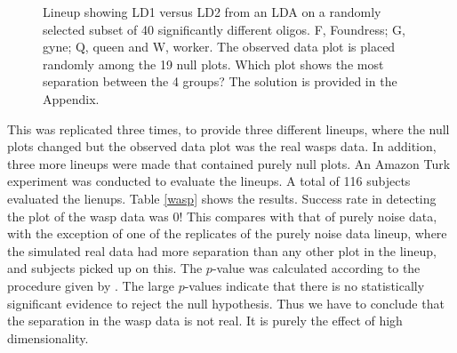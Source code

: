 \begin{figure}[hbtp]
   \centering
       \caption{Lineup showing LD1 versus LD2 from an LDA on a randomly selected subset of 40 significantly different oligos. F, Foundress; G, gyne; Q, queen and W, worker. The observed data plot is placed randomly among the 19 null plots. Which plot shows the most separation between the 4 groups? The solution is provided in the Appendix.}
       \label{toth_lineup}
\end{figure} 

This was replicated three times, to provide three different lineups, where the null plots changed but the observed data plot was the real wasps data. In addition, three more lineups were made that contained purely null plots. An Amazon Turk experiment was conducted to evaluate the lineups.  A total of 116 subjects evaluated the lienups. Table \ref{wasp} shows the results. Success rate in detecting the plot of the wasp data was 0! This compares with that of purely noise data, with the exception of one of the replicates of the purely noise data lineup, where the simulated real data had more separation than any other plot in the lineup, and subjects picked up on this. The $p$-value was calculated according to the procedure given by \cite{majumder:2011}. The large $p$-values indicate that there is no statistically significant evidence to reject the null hypothesis. Thus we have to conclude that the separation in the wasp data is not real. It is purely the effect of high dimensionality. 

